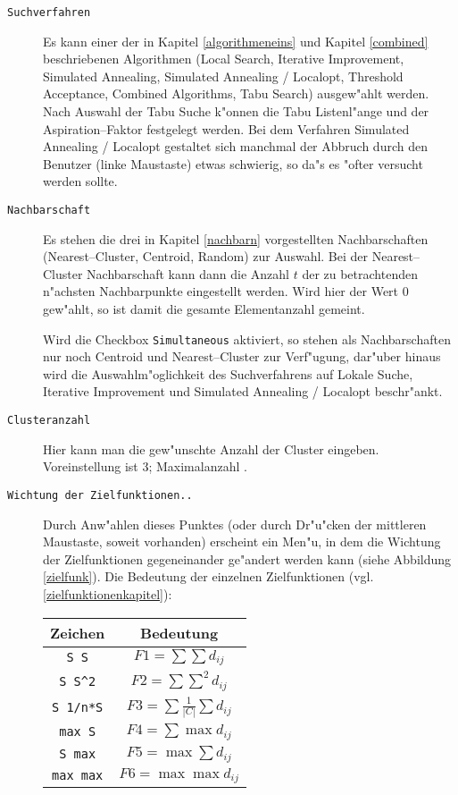 \begin{description}
\item[{\tt Suchverfahren}]
	Es kann einer der in Kapitel \ref{algorithmeneins} und Kapitel
	\ref{combined} beschriebenen
	Algorithmen (Local Search, Iterative Improvement, Simulated Annealing,
	Simulated Annealing / Localopt, Threshold Acceptance, Combined
	Algorithms, Tabu Search)
	ausgew"ahlt werden. Nach Auswahl der Tabu Suche k"onnen  die
	Tabu Listenl"ange und der Aspiration--Faktor festgelegt werden.
	Bei dem
	Verfahren Simulated Annealing / Localopt gestaltet sich manchmal der
	Abbruch durch den Benutzer (linke Maustaste) etwas schwierig, so
	da"s es "ofter versucht werden sollte.
\item[{\tt Nachbarschaft}]
	Es stehen die drei in Kapitel \ref{nachbarn} vorgestellten 
	Nachbarschaften (Nearest--Cluster, Centroid, Random) zur Auswahl.
	Bei der Nearest--Cluster Nachbarschaft kann dann die Anzahl $t$ der
	zu betrachtenden n"achsten Nachbarpunkte eingestellt werden. 
	Wird hier der Wert 0 gew"ahlt, so ist damit die gesamte 
	Elementanzahl gemeint.

	Wird die Checkbox {\tt Simultaneous} aktiviert, so stehen als 
	Nachbarschaften nur noch Centroid und Nearest--Cluster zur Verf"ugung,
	dar"uber hinaus wird die Auswahlm"oglichkeit des Suchverfahrens
	auf Lokale Suche, Iterative Improvement und Simulated Annealing /
	Localopt beschr"ankt.
\item[{\tt Clusteranzahl}] Hier kann man die gew"unschte Anzahl der Cluster
	eingeben. Voreinstellung ist 3; Maximalanzahl \MAXCLUSTER.
\item[{\tt Wichtung der Zielfunktionen..}] Durch Anw"ahlen dieses Punktes (oder
	durch Dr"u"cken der mittleren Maustaste, soweit vorhanden) erscheint
	ein Men"u, in dem die Wichtung der Zielfunktionen gegeneinander
	ge"andert werden kann (siehe Abbildung \ref{zielfunk}).
	Die Bedeutung der einzelnen Zielfunktionen (vgl. 
	\ref{zielfunktionenkapitel}):

	\begin{center}
	\begin{tabular}{c|c}
	Zeichen & Bedeutung \\
	\hline
	\verb-S S-  &  $F1 = \sum\sum d_{ij}$\\
	\verb-S S^2- &  $F2 = \sum\sum^2 d_{ij}$\\ 
	\verb-S 1/n*S-  & $ F3 = \sum\frac1{|C|}\sum d_{ij}$\\ 
	\verb-max S-  &  $F4 = \sum\max d_{ij}$\\ 
	\verb-S max-  &  $F5 = \max\sum d_{ij}$\\ 
	\verb-max max-  & $ F6 = \max\max d_{ij}$
	\end{tabular}
	\end{center}


\end{description}
